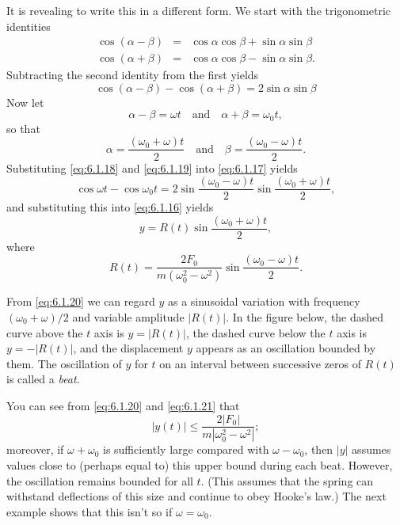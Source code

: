 \documentclass{ximera}
\begin{document}
\begin{example}
\begin{explanation}
It is revealing to write this in a different form.  We start with the
trigonometric identities
\begin{eqnarray*}
\cos(\alpha-\beta)&=&\cos\alpha\cos\beta+\sin\alpha\sin\beta\\
\cos(\alpha+\beta)&=&\cos\alpha\cos\beta-\sin\alpha\sin\beta.
\end{eqnarray*}
Subtracting the second identity from the first yields
\begin{equation}\label{eq:6.1.17}
\cos(\alpha-\beta)-\cos(\alpha+\beta)=2\sin\alpha\sin\beta
\end{equation}
 Now let
\begin{equation}\label{eq:6.1.18}
\alpha-\beta=\omega t\quad\mbox{and}\quad\alpha+\beta=\omega_0t,
\end{equation}
 so that
\begin{equation}\label{eq:6.1.19}
\alpha=\frac{(\omega_0+\omega)t}{2}\quad\mbox{and}\quad\beta=\frac{(\omega_0-\omega
)t}{2}.
\end{equation}
 Substituting \eqref{eq:6.1.18} and \eqref{eq:6.1.19} into \eqref{eq:6.1.17}
yields
 $$
\cos\omega t-\cos\omega_0t=
2\sin\frac{(\omega_0-\omega)t}{2}\sin\frac{(\omega_0+\omega)t}{2},
$$
and substituting this into \eqref{eq:6.1.16} yields
\begin{equation}\label{eq:6.1.20}
y=R(t)\sin\frac{(\omega_0+\omega)t}{2},
\end{equation}
 where
\begin{equation}\label{eq:6.1.21}
R(t)=\frac{2F_0}{m(\omega_0^2-\omega^2)}
\sin\frac{(\omega_0-\omega)t}{2}.
\end{equation}
 
From \eqref{eq:6.1.20} we can regard $y$ as a sinusoidal variation with
frequency $(\omega_0+\omega)/2$ and variable amplitude
$|R(t)|$. In the figure below, the dashed curve above the $t$ axis
is $y=|R(t)|$, the dashed curve below the $t$ axis is $y=-|R(t)|$, and
the displacement $y$ appears as an oscillation bounded by them. The
oscillation of $y$ for $t$ on an interval between successive zeros of
$R(t)$ is called a \textit{beat}.
 
\begin{center}
\end{center}
 
 
 
 
 
You can see from
\eqref{eq:6.1.20} and \eqref{eq:6.1.21} that
$$
|y(t)|\leq\frac{2|F_0|}{m|\omega_0^2-\omega^2|};
$$
moreover, if $\omega+\omega_0$ is sufficiently large compared with $\omega
-\omega_0$, then $|y|$ assumes values close to (perhaps equal to) this
upper bound during each beat. However, the oscillation remains bounded for
all $t$. (This assumes that the spring can withstand
deflections of this size and continue to obey Hooke's law.)  The next
example shows that this isn't  so if $\omega=\omega_0$.
 
\end{explanation}
\end{example}
 
\end{document}
